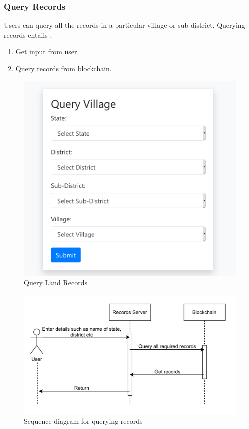 \documentclass{article}
\begin{document}
           

        \subsubsection{Query Records}
            Users can query all the records in a particular village or sub-district.
            Querying records entails :-
            \begin{enumerate}
                \item Get input from user.
                \item Query records from blockchain.
            \end{enumerate}
            
            \begin{figure}[htbp]
                \includegraphics[scale=0.25]{records_query_records}
                \centering
                \caption{Query Land Records}
            \end{figure}

            \begin{figure}[htbp]
                \includegraphics[scale=0.25]{records_seq_query_records}
                \centering
                \caption{Sequence diagram for querying records}
            \end{figure}
\end{document}

